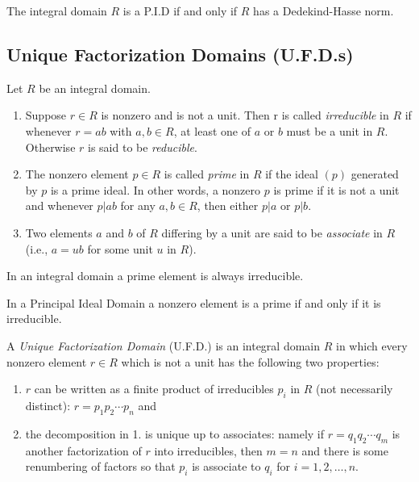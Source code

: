 \documentclass[../main]{subfiles}
\begin{document}
\begin{prop}
 The integral domain $R$ is a P.I.D if and only if $R$ has a Dedekind-Hasse norm.
\end{prop}


\subsection{Unique Factorization Domains (U.F.D.s)}


\begin{dfn}
 Let $R$ be an integral domain.
 \begin{enumerate}
  \item Suppose $r \in R$ is nonzero and is not a unit. Then r is called \textit{irreducible} in $R$ if whenever $r = ab$ with $a,b\in R$, at least one of $a$ or $b$ must be a unit in $R$. Otherwise $r$ is said to be \textit{reducible}.
  
  \item The nonzero element $p \in R$ is called \textit{prime} in $R$ if the ideal $(p)$ generated by $p$ is a prime ideal. In other words, a nonzero $p$ is prime if it is not a unit and whenever $p|ab$ for any $a,b \in R$, then either $p|a$ or $p|b$.
  
  \item Two elements $a$ and $b$ of $R$ differing by a unit are said to be \textit{associate} in $R$ (i.e., $a=ub$ for some unit $u$ in $R$).
 \end{enumerate}
\end{dfn}


\begin{prop}
 In an integral domain a prime element is always irreducible.
\end{prop}


\begin{prop}
 In a Principal Ideal Domain a nonzero element is a prime if and only if it is irreducible.
\end{prop}


\begin{dfn}
 A \textit{Unique Factorization Domain} (U.F.D.) is an integral domain $R$ in which every nonzero element $r \in R$ which is not a unit has the following two properties:
 \begin{enumerate}
  \item $r$ can be written as a finite product of irreducibles $p_i$ in $R$ (not necessarily distinct): $r=p_1 p_2 \cdots p_n$ and 
  
  \item the decomposition in 1. is unique up to associates: namely if $r = q_1 q_2 \cdots q_m$ is another factorization of $r$ into irreducibles, then $m = n$ and there is some renumbering of factors so that $p_i$ is associate to $q_i$ for $i = 1, 2, \ldots, n$. 
 \end{enumerate}
\end{dfn}
\end{document}
